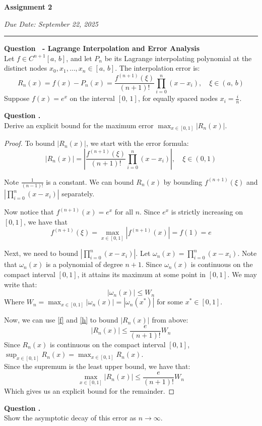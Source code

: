 \documentclass[12pt]{article}
\newcounter{question}
\newcounter{subquest}
\newcommand{\question}[1]{
    \stepcounter{question} 
    \vspace{1em}
    \textbf{\Large Question \thequestion \ - #1}
    \vspace{.5em} 
    \setcounter{subquest}{0}\ \\}
\newcommand{\subquestion}{
    \stepcounter{subquest} 
    \vspace{.5em}
    \textbf{\large Question \thequestion.\thesubquest}
    \vspace{.25em}\ \\}
\begin{document}
\begin{center}
\textbf{\huge Assignment 2}

{\large\emph{Due Date: September 22, 2025}}
\vspace{1em}
\end{center}
\hrule

\question{Lagrange Interpolation and Error Analysis}
Let $f \in C^{n+1}[a,\,b]$, and let $P_n$ be its Lagrange interpolating polynomial at the distinct nodes $x_0, x_1, \dots, x_n \in [a,\,b]$. The interpolation error is: 
\[R_n(x) = f(x) - P_n(x) = \frac{f^{(n+1)}(\xi)}{(n+1)!} \prod_{i=0}^{n}(x - x_i),\quad \xi \in (a,\,b)\]
Suppose $f(x) = e^x$ on the interval $[0,\,1]$, for equally spaced nodes $x_i = \frac{i}{n}$.

\subquestion
Derive an explicit bound for the maximum error $\max_{x \in [0,1]} |R_n(x)|$.


\begin{proof}
    To bound $|R_n(x)|$, we start with the error formula:
    \[|R_n(x)| = \left|\frac{f^{(n+1)}(\xi)}{(n+1)!} \prod_{i=0}^{n}(x - x_i)\right|, \quad \xi \in (0,1)\]
    
    Note $\frac{1}{(n-1)!}$ is a constant. We can bound $R_n(x)$ by bounding $f^{(n+1)}(\xi)$ and $\left|\prod_{i=0}^{n}(x - x_i)\right|$ separately.
    
    Now notice that $f^{(n+1)}(x) = e^x$ for all $n$. Since $e^x$ is strictly increasing on $[0,1]$, we have that \[f^{(n+1)}(\xi) = \max_{x \in [0,1]} |f^{(n+1)}(x)| = f(1) = e \label{f}\tag{1}\]

    Next, we need to bound $\left|\prod_{i=0}^{n}(x - x_i)\right|$. Let $\omega_{n}(x) = \prod_{i=0}^{n}(x - x_i)$. Note that $\omega_{n}(x)$ is a polynomial of degree $n+1$. Since $\omega_{n}(x)$ is continuous on the compact interval $[0,1]$, it attains its maximum at some point in $[0,1]$. We may write that: 
    \[|\omega_{n}(x)| \leq W_n \label{h}\tag{2}\]
    Where $W_n = \max_{x \in [0,1]} |\omega_{n}(x)| = |\omega_{n}(x^*)|$ for some $x^* \in [0,1]$.

    Now, we can use \eqref{f} and \eqref{h} to bound $|R_n(x)|$ from above:
    \[|R_n(x)| \leq \frac{e}{(n+1)!} W_n\]
    Since $R_n(x)$ is continuous on the compact interval $[0,1]$, $\sup_{x\in[0,1]} R_n(x) = \max_{x\in[0,1]} R_n(x)$. \\ Since the supremum is the least upper bound, we have that:
    \[\max_{x \in [0,1]} |R_n(x)| \leq \frac{e}{(n+1)!} W_n\]
    Which gives us an explicit bound for the remainder.
\end{proof}

\subquestion
Show the asymptotic decay of this error as $n \to \infty$.
\end{document}
